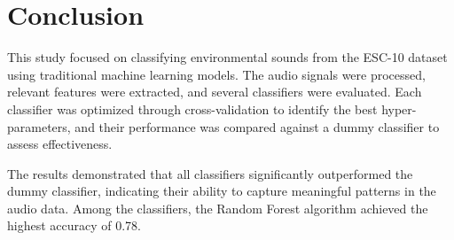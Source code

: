 \documentclass[journal]{IEEEtran}
\begin{document}
%




\section{Conclusion}
This study focused on classifying environmental sounds from the ESC-10 dataset using traditional machine learning models. The audio signals were processed, relevant features were extracted, and several classifiers were evaluated. Each classifier was optimized through cross-validation to identify the best hyper-parameters, and their performance was compared against a dummy classifier to assess effectiveness.

The results demonstrated that all classifiers significantly outperformed the dummy classifier, indicating their ability to capture meaningful patterns in the audio data. Among the classifiers, the Random Forest algorithm achieved the highest accuracy of 0.78.
\end{document}
